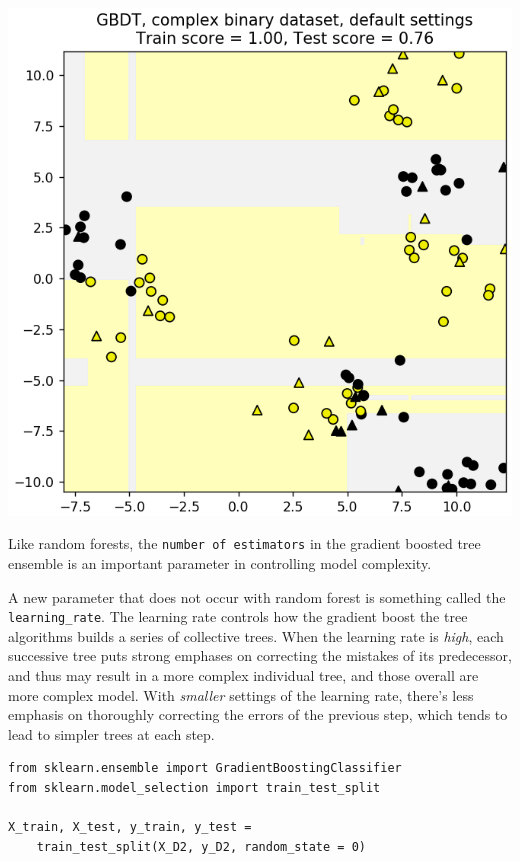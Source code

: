 \begin{multicols}{2}
\begin{center}
	\includegraphics[width=\linewidth]{img/GBDT-3.png} 
\end{center}


Like random forests, the \texttt{number of estimators} in the gradient boosted tree ensemble is an important parameter in controlling model complexity. 

A new parameter that does not occur with random forest is something called the \texttt{learning_rate}. The learning rate controls how the gradient boost the tree algorithms builds a series of collective trees. When the learning rate is \emph{high}, each successive tree puts strong emphases on correcting the mistakes of its predecessor, and thus may result in a more complex individual tree, and those overall are more complex model. With \emph{smaller} settings of the learning rate, there's less emphasis on thoroughly correcting the errors of the previous step, which tends to lead to simpler trees at each step. 

{\scriptsize
\begin{verbatim}
from sklearn.ensemble import GradientBoostingClassifier
from sklearn.model_selection import train_test_split

X_train, X_test, y_train, y_test = 
    train_test_split(X_D2, y_D2, random_state = 0)


\end{verbatim}}
\end{multicols}
